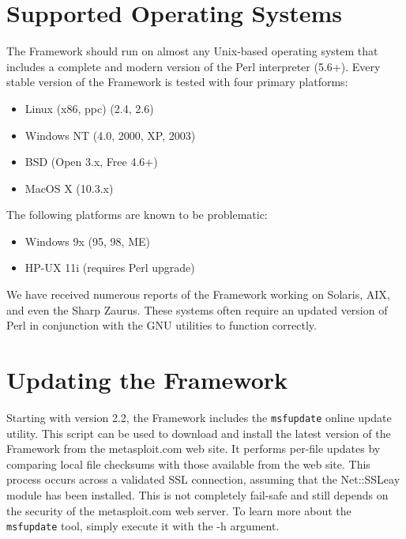 \documentclass{report}
\begin{document}
    \section{Supported Operating Systems}
    \label{INSTALL-SUPPORT}
\par
The Framework should run on almost any Unix-based operating system that includes
a complete and modern version of the Perl interpreter (5.6+). Every stable
version of the Framework is tested with four primary platforms: 

\begin{itemize}
\item Linux (x86, ppc) (2.4, 2.6)
\item Windows NT (4.0, 2000, XP, 2003)
\item BSD (Open 3.x, Free 4.6+)
\item MacOS X (10.3.x)
\end{itemize}

\par
The following platforms are known to be problematic:
\begin{itemize}
\item Windows 9x (95, 98, ME)
\item HP-UX 11i (requires Perl upgrade)
\end{itemize}

\par
We have received numerous reports of the Framework working on Solaris,
AIX, and even the Sharp Zaurus. These systems often require an updated version
of Perl in conjunction with the GNU utilities to function correctly.


    \section{Updating the Framework}
    \label{INSTALL-UPDATE}
\par
Starting with version 2.2, the Framework includes the \texttt{msfupdate} online update
utility. This script can be used to download and install the latest version of
the Framework from the metasploit.com web site. It performs per-file updates by
comparing local file checksums with those available from the web site. This
process occurs across a validated SSL connection, assuming that the Net::SSLeay
module has been installed. This is not completely fail-safe and still depends on
the security of the metasploit.com web server. To learn more about the
\texttt{msfupdate} tool, simply execute it with the -h argument. 
\end{document}
